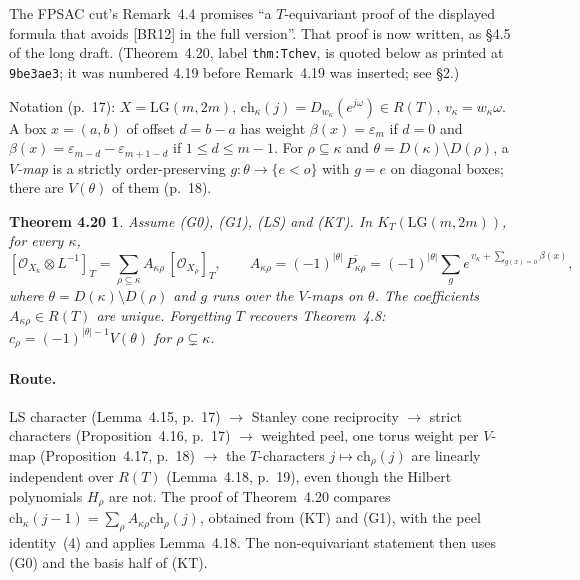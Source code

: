 \documentclass[11pt]{article}
\theoremstyle{plain}
\newtheorem*{thmE}{Theorem 4.20}
\theoremstyle{remark}
\newcommand{\cO}{\mathcal{O}}
\newcommand{\LG}{\mathrm{LG}}
\newcommand{\ch}{\mathrm{ch}}
\begin{document}
The FPSAC cut's Remark~4.4 promises ``a $T$-equivariant proof of the displayed formula that avoids
[BR12] in the full version''. That proof is now written, as \S4.5 of the long draft. (Theorem~4.20,
label \texttt{thm:Tchev}, is quoted below as printed at \texttt{9be3ae3}; it was numbered 4.19 before Remark~4.19 was inserted; see \S2.)

Notation (p.~17): $X=\LG(m,2m)$, $\ch_\kappa(j)=D_{w_\kappa}(e^{j\omega})\in R(T)$, $v_\kappa=w_\kappa\omega$.
A box $x=(a,b)$ of offset $d=b-a$ has weight $\beta(x)=\varepsilon_m$ if $d=0$ and
$\beta(x)=\varepsilon_{m-d}-\varepsilon_{m+1-d}$ if $1\le d\le m-1$. For $\rho\subseteq\kappa$ and
$\theta=D(\kappa)\setminus D(\rho)$, a \emph{$V$-map} is a strictly order-preserving
$g\colon\theta\to\{e<o\}$ with $g=e$ on diagonal boxes; there are $V(\theta)$ of them (p.~18).

\begin{thmE}
Assume \textup{(G0), (G1), (LS)} and \textup{(KT)}. In $K_T(\LG(m,2m))$, for every $\kappa$,
\[
[\cO_{X_\kappa}\otimes L^{-1}]_T=\sum_{\rho\subseteq\kappa}A_{\kappa\rho}\,[\cO_{X_\rho}]_T,\qquad
A_{\kappa\rho}=(-1)^{|\theta|}\,\overline{P_{\kappa\rho}}
=(-1)^{|\theta|}\sum_g e^{\,v_\kappa+\sum_{g(x)=o}\beta(x)},
\]
where $\theta=D(\kappa)\setminus D(\rho)$ and $g$ runs over the $V$-maps on $\theta$. The coefficients
$A_{\kappa\rho}\in R(T)$ are unique. Forgetting $T$ recovers Theorem~4.8:
$c_\rho=(-1)^{|\theta|-1}V(\theta)$ for $\rho\subsetneq\kappa$.
\end{thmE}

\paragraph{Route.} LS character (Lemma~4.15, p.~17) $\to$ Stanley cone reciprocity $\to$ strict
characters (Proposition~4.16, p.~17) $\to$ weighted peel, one torus weight per $V$-map
(Proposition~4.17, p.~18) $\to$ the $T$-characters $j\mapsto\ch_\rho(j)$ are linearly independent
over $R(T)$ (Lemma~4.18, p.~19), even though the Hilbert polynomials $H_\rho$ are not. The proof of
Theorem~4.20 compares $\ch_\kappa(j-1)=\sum_\rho A_{\kappa\rho}\ch_\rho(j)$, obtained from (KT) and
(G1), with the peel identity~(4) and applies Lemma~4.18. The non-equivariant statement then uses (G0)
and the basis half of (KT).
\end{document}
